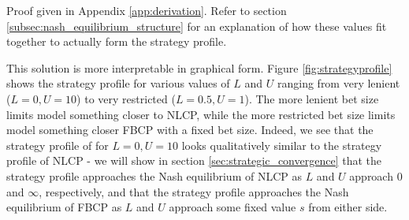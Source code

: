 \documentclass[a4paper,12pt]{article}
\theoremstyle{plain}
\theoremstyle{definition}
\begin{document}
Proof given in Appendix \ref{app:derivation}. Refer to section \ref{subsec:nash_equilibrium_structure} for an explanation of how these values fit together to actually form the strategy profile.

This solution is more interpretable in graphical form. Figure \ref{fig:strategyprofile} shows the strategy profile for various values of $L$ and $U$ ranging from very lenient ($L=0, U=10$) to very restricted ($L=0.5, U=1$). The more lenient bet size limits model something closer to NLCP, while the more restricted bet size limits model something closer FBCP with a fixed bet size. Indeed, we see that the strategy profile of for $L=0, U=10$ looks qualitatively similar to the strategy profile of NLCP - we will show in section \ref{sec:strategic_convergence} that the strategy profile approaches the Nash equilibrium of NLCP as $L$ and $U$ approach $0$ and $\infty$, respectively, and that the strategy profile approaches the Nash equilibrium of FBCP as $L$ and $U$ approach some fixed value $s$ from either side.
\end{document}
